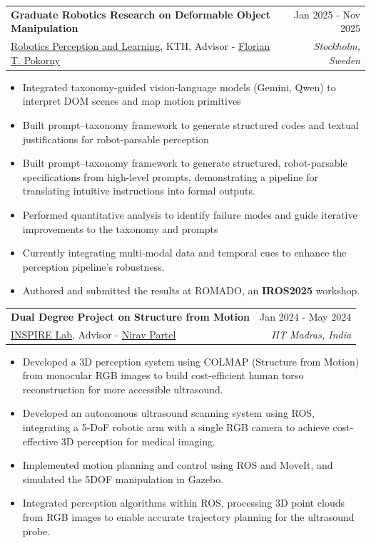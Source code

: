 \documentclass[letterpaper, 11pt]{article}
\makeatletter
\newcommand{\resumeItem}[1]{ \item\small{ {#1 \vspace{-2pt}} } }
\newcommand{\resumeSubheading}[4]{
\vspace{-1pt}
\item
\begin{tabular*}{1.0\textwidth}[t]{l@{\extracolsep{\fill}}r}
	\textbf{#1}       & {\small #2} \\
	{\small#3} & \textit{\small #4} \\
\end{tabular*}
\vspace{-10pt}
}
\newcommand{\resumeItemListStart}{\begin{itemize}[leftmargin=0.25in]}
\newcommand{\resumeItemListEnd}{\end{itemize}
\vspace{-5pt}}
\makeatother
\begin{document}
    \resumeSubheading{Graduate Robotics Research on Deformable Object Manipulation}{Jan 2025 - Nov 2025}{\href{https://www.kth.se/is/rpl}{Robotics Perception and Learning}, KTH, Advisor - 
    \href{https://www.kth.se/is/rpl}{Florian T. Pokorny}}{Stockholm, Sweden} 
    \resumeItemListStart 

        \resumeItem{Integrated taxonomy-guided vision-language models (Gemini, Qwen) to interpret DOM scenes and map 
        motion primitives}
        \resumeItem{Built prompt–taxonomy framework to generate structured codes and textual justifications for robot-parsable perception}
        \resumeItem{Built prompt–taxonomy framework to generate structured, robot-parsable specifications from high-level prompts, demonstrating a pipeline for translating intuitive instructions into formal outputs.}
        \resumeItem{Performed quantitative analysis to identify failure modes and guide iterative improvements to the taxonomy and prompts}
        \resumeItem{Currently integrating multi-modal data and temporal cues to enhance the perception pipeline's robustness.}
        \resumeItem{Authored and submitted the results at ROMADO, an \textbf{IROS2025} workshop.}
    \resumeItemListEnd

    \resumeSubheading{Dual Degree Project on Structure from Motion}{Jan 2024 - May 2024}{\href{https://niravatgit.github.io/INSPIRELab/}{INSPIRE Lab}, Advisor - \href{https://niravatgit.github.io/patelnirav.com/index.html}{{Nirav Partel}}}{IIT Madras, India}
    \resumeItemListStart 
        \resumeItem{Developed a 3D perception system using COLMAP (Structure from Motion) from monocular RGB images to build cost-efficient human torso reconstruction for more accessible ultrasound.}
        \resumeItem{Developed an autonomous ultrasound scanning system using ROS, integrating a 5-DoF robotic arm with a single RGB camera to achieve cost-effective 3D perception for medical imaging.}
        \resumeItem{Implemented motion planning and control using ROS and MoveIt, and simulated the 5DOF manipulation in Gazebo.}
        \resumeItem{Integrated perception algorithms within ROS, processing 3D point clouds from RGB images to enable accurate trajectory planning for the ultrasound probe.}
    \resumeItemListEnd
\end{document}
